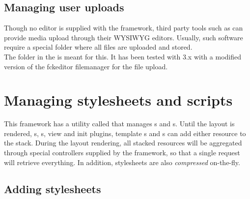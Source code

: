 \documentclass[pdftex,12pt,a4paper]{article}
\begin{document}
\subsection{Managing user uploads} \label{sec:managing-user-upload}

Though no editor is supplied with the framework, third party tools such as  can provide media upload through their WYSIWYG editors. Usually, such software require a special folder where all files are uploaded and stored.\\
The  folder in the  is meant for this. It has been tested with  3.x with a modified version of the fckeditor filemanager for the file upload.

\section{Managing stylesheets and scripts} \label{sec:managing-stylesheets-and-scripts}

This framework has a utility called  that manages s and s. Until the layout is rendered, s, s, view and init plugins, template s and s can add either resource to the stack. During the layout rendering, all stacked resources will be aggregated through special controllers supplied by the framework, so that a single request will retrieve everything. In addition, stylesheets are also \emph{compressed} on-the-fly.

\subsection{Adding stylesheets} \label{sec:adding-stylesheets}
\end{document}
